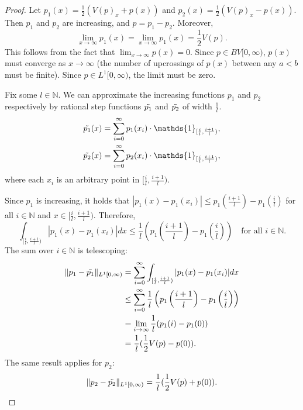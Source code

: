 \documentclass[a4paper]{article}
\theoremstyle{definition}
\numberwithin{equation}{section}
\numberwithin{theorem}{section}
\begin{document}
{\begin{proof}
    Let $p_1(x) = \frac{1}{2}(V(p)_x+p(x))$ and $p_2(x) = \frac{1}{2}(V(p)_x-p(x))$. Then $p_1$ and $p_2$ are increasing, and $p=p_1-p_2$. Moreover,
    \begin{equation*}
        \lim_{x\rightarrow\infty}p_1(x) = \lim_{x\rightarrow\infty}p_1(x) = \frac{1}{2}V(p).
    \end{equation*}
    This follows from the fact that $\lim_{x\rightarrow\infty}p(x) = 0$. Since $p\in BV[0,\infty)$, $p(x)$ must converge as $x\rightarrow\infty$ (the number of upcrossings of $p(x)$ between any $a<b$ must be finite). Since $p\in L^1[0,\infty)$, the limit must be zero.

    Fix some $l\in\mathbb{N}$. We can approximate the increasing functions $p_1$ and $p_2$ respectively by rational step functions $\Tilde{p_1}$ and $\Tilde{p_2}$ of width $\frac{1}{l}$.
    \begin{align*}
        \Tilde{p_1}(x) &= \sum_{i=0}^\infty p_1(x_i)\cdot\mathds{1}_{[\frac{i}{l},\frac{i+1}{l})},\\
        \Tilde{p_2}(x) &= \sum_{i=0}^\infty p_2(x_i)\cdot\mathds{1}_{[\frac{i}{l},\frac{i+1}{l})},
    \end{align*}
    where each $x_i$ is an arbitrary point in $[\frac{i}{l},\frac{i+1}{l})$.

    Since $p_1$ is increasing, it holds that $|p_1(x)-p_1(x_i)|\leq p_1(\frac{i+1}{l})-p_1(\frac{i}{l})$ for all $i\in\mathbb{N}$ and $x\in[\frac{i}{l},\frac{i+1}{l})$. Therefore,
    \begin{equation*}
        \int_{[\frac{i}{l},\frac{i+1}{l})}|p_1(x)-p_1(x_i)|dx\leq \frac{1}{l}\left(p_1\left(\frac{i+1}{l}\right)-p_1\left(\frac{i}{l}\right)\right)\quad\text{for all $i\in\mathbb{N}$.}
    \end{equation*}
    The sum over $i\in\mathbb{N}$ is telescoping:
    \begin{align*}
        \lVert p_1-\Tilde{p_1}\rVert_{ L^1[0,\infty)} &= \sum_{i=0}^\infty\int_{[\frac{i}{l},\frac{i+1}{l})}|p_1(x)-p_1(x_i)|dx\\
        &\leq\sum_{i=0}^\infty\frac{1}{l}\left(p_1\left(\frac{i+1}{l}\right)-p_1\left(\frac{i}{l}\right)\right)\\
        &=\lim_{i\rightarrow\infty}\frac{1}{l}(p_1(i)-p_1(0))\\
        &= \frac{1}{l}(\frac{1}{2}V(p)-p(0)).
    \end{align*}
    The same result applies for $p_2$:
    \begin{equation*}
        \lVert p_2-\Tilde{p_2}\rVert_{ L^1[0,\infty)}= \frac{1}{l}(\frac{1}{2}V(p)+p(0)).
    \end{equation*}


\end{proof}}
\end{document}

